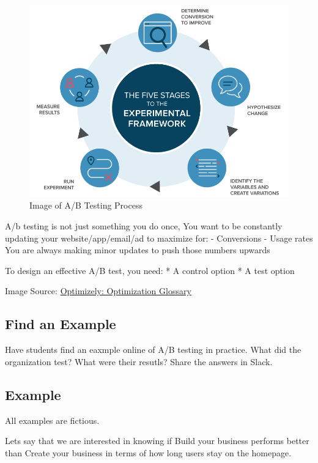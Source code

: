 \documentclass[]{article}
\begin{document}
\begin{figure}
\centering
\includegraphics{docs/ab-testing-process-6.png}
\caption{Image of A/B Testing Process}
\end{figure}

A/b testing is not just something you do once, You want to be constantly
updating your website/app/email/ad to maximize for: - Conversions -
Usage rates You are always making minor updates to push those numbers
upwards

To design an effective A/B test, you need: * A control option * A test
option

Image Source:
\href{https://www.optimizely.com/optimization-glossary/ab-testing/}{Optimizely:
Optimization Glossary}

\subsection{Find an Example}\label{find-an-example}

Have students find an eaxmple online of A/B testing in practice. What
did the organization test? What were their resutls? Share the answers in
Slack.

\subsection{Example}\label{example}

All examples are fictious.

Lets say that we are interested in knowing if Build your business
performs better than Create your business in terms of how long users
stay on the homepage.
\end{document}
